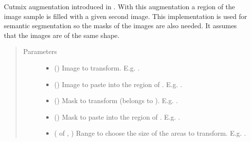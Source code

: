 \documentclass[letterpaper,10pt,english]{sphinxmanual}
\begin{document}

\begin{fulllineitems}
\label{\detokenize{data/generators/augmentors:data.generators.augmentors.cutmix}}
Cutmix augmentation introduced in . With this augmentation a region of the image sample is filled
with a given second image. This implementation is used for semantic segmentation so the masks of the images are
also needed. It assumes that the images are of the same shape.
\begin{quote}\begin{description}
\item[{Parameters}] \leavevmode\begin{itemize}
\item {} 
 () \textendash{} Image to transform. E.g. .

\item {} 
 () \textendash{} Image to paste into the region of . E.g. .

\item {} 
 () \textendash{} Mask to transform (belongs to ). E.g. .

\item {} 
 () \textendash{} Mask to paste into the region of . E.g. .

\item {} 
 ( of , ) \textendash{} Range to choose the size of the areas to transform. E.g. .


\end{itemize}
\end{description}
\end{quote}
\end{fulllineitems}
\end{document}
